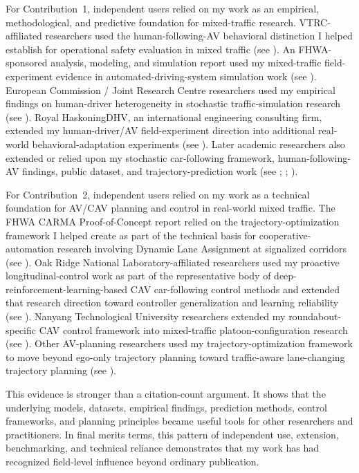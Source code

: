 \documentclass[11pt,letterpaper]{article}
\begin{document}
For Contribution~1, independent users relied on my work as an empirical, methodological, and predictive foundation for mixed-traffic research. VTRC-affiliated researchers used the human-following-AV behavioral distinction I helped establish for operational safety evaluation in mixed traffic (see ). An FHWA-sponsored analysis, modeling, and simulation report used my mixed-traffic field-experiment evidence in automated-driving-system simulation work (see ). European Commission / Joint Research Centre researchers used my empirical findings on human-driver heterogeneity in stochastic traffic-simulation research (see ). Royal HaskoningDHV, an international engineering consulting firm, extended my human-driver/AV field-experiment direction into additional real-world behavioral-adaptation experiments (see ). Later academic researchers also extended or relied upon my stochastic car-following framework, human-following-AV findings, public dataset, and trajectory-prediction work (see ; ; ).

For Contribution~2, independent users relied on my work as a technical foundation for AV/CAV planning and control in real-world mixed traffic. The FHWA CARMA Proof-of-Concept report relied on the trajectory-optimization framework I helped create as part of the technical basis for cooperative-automation research involving Dynamic Lane Assignment at signalized corridors (see ). Oak Ridge National Laboratory-affiliated researchers used my proactive longitudinal-control work as part of the representative body of deep-reinforcement-learning-based CAV car-following control methods and extended that research direction toward controller generalization and learning reliability (see ). Nanyang Technological University researchers extended my roundabout-specific CAV control framework into mixed-traffic platoon-configuration research (see ). Other AV-planning researchers used my trajectory-optimization framework to move beyond ego-only trajectory planning toward traffic-aware lane-changing trajectory planning (see ).

This evidence is stronger than a citation-count argument. It shows that the underlying models, datasets, empirical findings, prediction methods, control frameworks, and planning principles became useful tools for other researchers and practitioners. In final merits terms, this pattern of independent use, extension, benchmarking, and technical reliance demonstrates that my work has had recognized field-level influence beyond ordinary publication.
\end{document}
